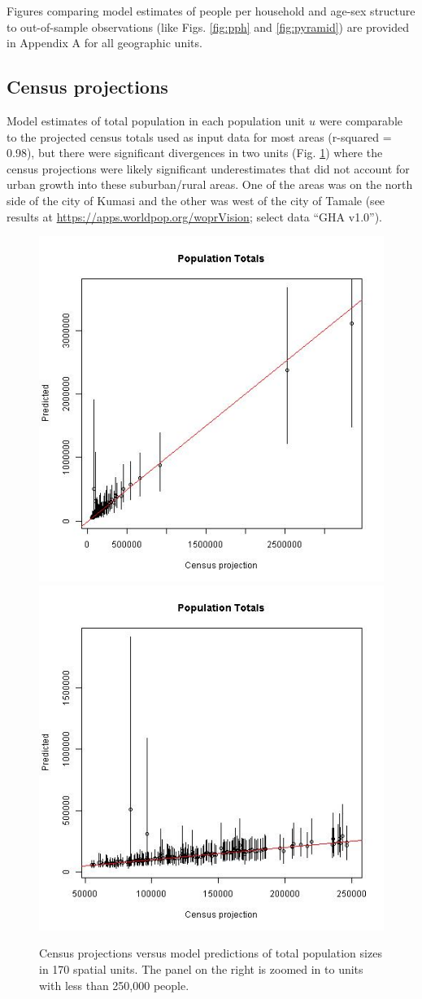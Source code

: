 \documentclass[]{book}
\begin{document}
Figures comparing model estimates of people per household and age-sex
structure to out-of-sample observations (like Figs. \ref{fig:pph} and
\ref{fig:pyramid}) are provided in Appendix A for all geographic units.

\subsection{Census projections}\label{census-projections}

Model estimates of total population in each population unit \(u\) were
comparable to the projected census totals used as input data for most
areas (r-squared = 0.98), but there were significant divergences in two
units (Fig. \ref{fig:projections}) where the census projections were
likely significant underestimates that did not account for urban growth
into these suburban/rural areas. One of the areas was on the north side
of the city of Kumasi and the other was west of the city of Tamale (see
results at \url{https://apps.worldpop.org/woprVision}; select data ``GHA
v1.0'').

\begin{figure}
\includegraphics[width=0.5\linewidth]{dat/GHAv1/totpop} \includegraphics[width=0.5\linewidth]{dat/GHAv1/totpop_zoom} \caption{Census projections versus model predictions of total population sizes in 170 spatial units. The panel on the right is zoomed in to units with less than 250,000 people.}\label{fig:projections}
\end{figure}
\end{document}
